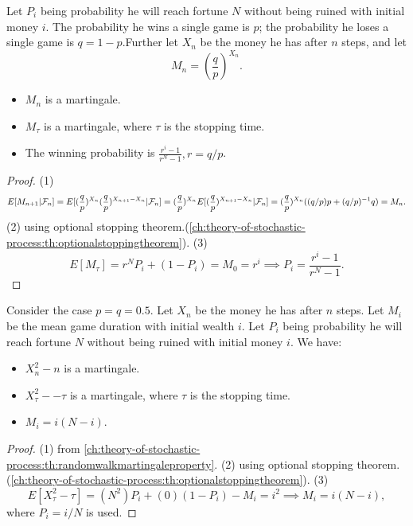 \begin{refsection}
\begin{lemma}\cite[220]{privault2013understanding}
	Let $P_i$ being probability he will reach fortune $N$ without being ruined with initial money $i$. The probability he wins a single game is $p$; the probability he loses a single game is $q=1-p$.Further let $X_n$ be the money he has after $n$ steps, and let
	$$M_n = (\frac{q}{p})^{X_n}.$$
	\begin{itemize}
		\item $M_n$ is a martingale.
		\item $M_\tau$ is a martingale, where $\tau$ is the stopping time.
		\item The winning probability is $\frac{r^i-1}{r^N-1},r=q/p$.
	\end{itemize}
\end{lemma}
\begin{proof}
	(1) 
$$E[M_{n+1}|\mathcal{F}_n] = E[(\frac{q}{p})^{X_n}(\frac{q}{p})^{X_{n+1}-X_n}|\mathcal{F}_n] = (\frac{q}{p})^{X_n}E[(\frac{q}{p})^{X_{n+1}-X_n}|\mathcal{F}_n] = (\frac{q}{p})^{X_n} ((q/p) p + (q/p)^{-1}q) = M_n.$$	
 (2) using optional stopping theorem.(\autoref{ch:theory-of-stochastic-process:th:optionalstoppingtheorem}). (3) $$E[M_\tau] = r^N P_i +  (1 - P_i) = M_0 = r^i \implies P_i = \frac{r^i-1}{r^N-1}.$$
\end{proof}

\begin{lemma}\cite[220]{privault2013understanding}
Consider the case $p=q=0.5$. Let $X_n$ be the money he has after $n$ steps. Let $M_i$ be the mean game duration with initial wealth $i$. Let $P_i$ being probability he will reach fortune $N$ without being ruined with initial money $i$. We have:
\begin{itemize}
	\item $X_n^2 - n$ is a martingale.
	\item $X_\tau^2 -- \tau$ is a martingale, where $\tau$ is the stopping time.
	\item $M_i = i(N-i)$.
\end{itemize}
\end{lemma}
\begin{proof}
	(1) from \autoref{ch:theory-of-stochastic-process:th:randomwalkmartingaleproperty}.	
(2) using optional stopping theorem.(\autoref{ch:theory-of-stochastic-process:th:optionalstoppingtheorem}). (3) $$E[X_\tau^2 - \tau] = (N^2) P_i +  (0)(1 - P_i) - M_i = i^2 \implies M_i = i(N-i),$$
where $P_i = i/N$ is used. 	
\end{proof}



\end{refsection}
